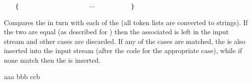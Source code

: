 \documentclass[oneside]{book}
\begin{document}
\begin{function}{\strCaseTF}
\begin{syntax}
 
~ ~ \verb|{|
~ ~ ~ ~  
~ ~ ~ ~  
~ ~ ~ ~ $\cdots$
~ ~ ~ ~  
~ ~ \verb|}|
~ ~ 
~ ~ 
\end{syntax}
Compares the  in turn with each
of the  (all token lists are converted to strings).
If the two are equal (as described for
) then the associated  is left in the
input stream and other cases are discarded. If any of the
cases are matched, the  is also inserted into the
input stream (after the code for the appropriate case), while if none
match then the  is inserted.
\begin{demohigh}
\IgnoreSpacesOn
{} {
  {aaa} {\tlSet{}}
  {bbb} {\tlSet{}}
  {ccb} {\tlSet{}}
}{
  \prgReturn{\tlUse\lTmpkTl}
}{
}
\IgnoreSpacesOff
\end{demohigh}
\end{function}
\end{document}
